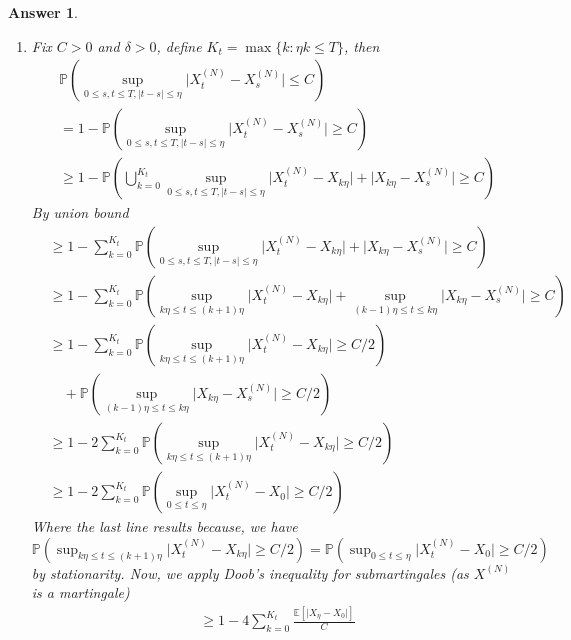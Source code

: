 \documentclass[12pt]{article}
\theoremstyle{colon}
\newtheorem*{answer}{Answer}
\begin{document}
\begin{answer}
\begin{enumerate}[label=\alph*)]
    \item Fix $C > 0$ and $\delta > 0$, define $K_t = \max \{ k : \eta k \leq T \}$, then
      \begin{align*}
        &\mathbb{P} \left( \sup_{0 \leq s, t \leq T, \lvert t - s \rvert \leq \eta} \lvert X_t^{(N)} - X_s^{(N)} \rvert \leq C \right) \\
        &= 1 - \mathbb{P} \left( \sup_{0 \leq s, t \leq T, \lvert t - s \rvert \leq \eta} \lvert X_t^{(N)} - X_s^{(N)} \rvert \geq C \right) \\
        &\geq 1 - \mathbb{P} \left( \bigcup_{k=0}^{K_t} \sup_{0 \leq s, t \leq T, \lvert t - s \rvert \leq \eta} \lvert X_t^{(N)} - X_{k \eta} \rvert + \lvert X_{k \eta} - X_s^{(N)} \rvert \geq C \right)
      \end{align*}
      By union bound
      \begin{align*}
        &\geq 1 - \sum_{k=0}^{K_t} \mathbb{P} \left( \sup_{0 \leq s, t \leq T, \lvert t - s \rvert \leq \eta} \lvert X_t^{(N)} - X_{k \eta} \rvert + \lvert X_{k \eta} - X_s^{(N)} \rvert \geq C \right) \\
        &\geq 1 - \sum_{k=0}^{K_t} \mathbb{P} \left( \sup_{k \eta \leq t \leq (k+1) \eta} \lvert X_t^{(N)} - X_{k \eta} \rvert + \sup_{(k-1) \eta \leq t \leq k \eta} \lvert X_{k \eta} - X_s^{(N)} \rvert \geq C \right) \\
        &\geq 1 - \sum_{k=0}^{K_t} \mathbb{P} \left( \sup_{k \eta \leq t \leq (k+1) \eta} \lvert X_t^{(N)} - X_{k \eta} \rvert \geq C/2 \right) \\
        &\quad + \mathbb{P} \left( \sup_{(k-1) \eta \leq t \leq k \eta} \lvert X_{k \eta} - X_s^{(N)} \rvert \geq C/2 \right) \\
        &\geq 1 - 2 \sum_{k=0}^{K_t} \mathbb{P} \left( \sup_{k \eta \leq t \leq (k+1) \eta} \lvert X_t^{(N)} - X_{k \eta} \rvert \geq C/2 \right) \\
        &\geq 1 - 2 \sum_{k=0}^{K_t} \mathbb{P} \left( \sup_{0 \leq t \leq \eta} \lvert X_t^{(N)} - X_0 \rvert \geq C/2 \right)
      \end{align*}
      Where the last line results because, we have $\mathbb{P} ( \sup_{k \eta \leq t \leq (k+1) \eta} \lvert X_t^{(N)} - X_{k \eta} \rvert \geq C/2) = \mathbb{P}( \sup_{0 \leq t \leq \eta} \lvert X_t^{(N)} - X_0 \rvert \geq C/2)$ by stationarity. Now, we apply Doob's inequality for submartingales (as $X^{(N)}$ is a martingale)
      \begin{align*}
        &\geq 1 - 4 \sum_{k=0}^{K_t} \frac{\mathbb{E}[\lvert X_\eta - X_0 \rvert]}{C} \\

\end{align*}
\end{enumerate}
\end{answer}
\end{document}
